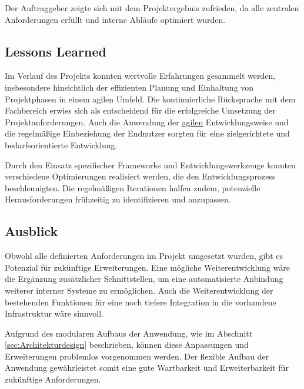Der Auftraggeber zeigte sich mit dem Projektergebnis zufrieden, da alle zentralen Anforderungen erfüllt und interne Abläufe optimiert wurden.

\subsection{Lessons Learned}
\label{sec:LessonsLearned}

Im Verlauf des Projekts konnten wertvolle Erfahrungen gesammelt werden, insbesondere hinsichtlich der effizienten Planung und Einhaltung von Projektphasen in einem agilen Umfeld. Die kontinuierliche Rücksprache mit dem Fachbereich erwies sich als entscheidend für die erfolgreiche Umsetzung der Projektanforderungen. Auch die Anwendung der \hyperlink{agil}{\textcolor{AOBlau}{agilen}} Entwicklungsweise und die regelmäßige Einbeziehung der Endnutzer sorgten für eine zielgerichtete und bedarfsorientierte Entwicklung.

Durch den Einsatz spezifischer Frameworks und Entwicklungswerkzeuge konnten verschiedene Optimierungen realisiert werden, die den Entwicklungsprozess beschleunigten. Die regelmäßigen Iterationen halfen zudem, potenzielle Herausforderungen frühzeitig zu identifizieren und anzupassen.

\subsection{Ausblick}
\label{sec:Ausblick}

Obwohl alle definierten Anforderungen im Projekt umgesetzt wurden, gibt es Potenzial für zukünftige Erweiterungen. Eine mögliche Weiterentwicklung wäre die Ergänzung zusätzlicher Schnittstellen, um eine automatisierte Anbindung weiterer interner Systeme zu ermöglichen. Auch die Weiterentwicklung der bestehenden Funktionen für eine noch tiefere Integration in die vorhandene Infrastruktur wäre sinnvoll.

Aufgrund des modularen Aufbaus der Anwendung, wie im Abschnitt \ref{sec:Architekturdesign} beschrieben, können diese Anpassungen und Erweiterungen problemlos vorgenommen werden. Der flexible Aufbau der Anwendung gewährleistet somit eine gute Wartbarkeit und Erweiterbarkeit für zukünftige Anforderungen.
